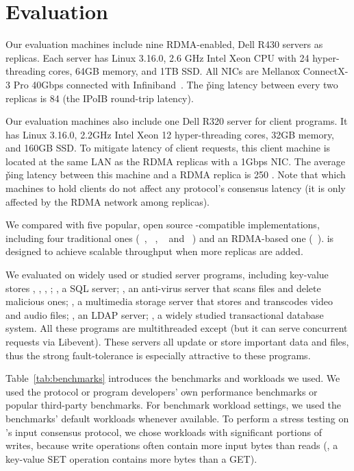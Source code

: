 \section{Evaluation} \label{sec:evaluation}





Our evaluation machines include nine RDMA-enabled, Dell R430 servers as \paxos 
replicas. Each server has Linux 3.16.0, 2.6 GHz Intel Xeon CPU with 24 
hyper-threading cores, 64GB memory, and 1TB SSD. All NICs are Mellanox 
ConnectX-3 Pro 40Gbps connected with Infiniband~\cite{infiniband}. 
The \v{ping} latency between every two replicas is 84 \us (the IPoIB 
round-trip latency).
%

Our evaluation machines also include one Dell R320 server for client programs. 
It has Linux 3.16.0, 2.2GHz Intel Xeon 12 hyper-threading cores, 32GB memory, 
and 160GB SSD. To mitigate latency of client requests, this client machine is 
located at the same LAN as the RDMA replicas with a 1Gbps NIC. The average 
\v{ping} latency between this machine and a RDMA replica is 250 \us. Note that 
which machines to hold clients do not affect any \paxos protocol's consensus 
latency (it is only affected by the RDMA network among replicas).

We compared \xxx with five popular, open source \paxos-compatible 
implementations,
including four traditional ones (\libpaxos~\cite{libpaxos},
\zookeeper~\cite{zookeeper}, \crane~\cite{crane:sosp15} and
\spaxos~\cite{spaxos:srds12}) and an RDMA-based one 
(\dare~\cite{dare:hpdc15}). \spaxos is designed to achieve scalable throughput 
when more replicas are added. 

We evaluated \xxx on \nprog widely used or studied server programs, including
\nkvprog key-value stores \redis, \memcached, \ssdb, \mongodb; \mysql, a SQL
server; \clamav, an anti-virus server that scans files and delete malicious ones;
\mediatomb, a multimedia storage server that stores and transcodes video and
audio files; \openldap, an LDAP server; \calvin, a widely studied transactional
database system. All these programs are multithreaded except \redis (but it can 
serve concurrent requests via Libevent). These servers all update or store 
important data and files, thus the strong \paxos fault-tolerance is especially 
attractive to these programs.


Table~\ref{tab:benchmarks} introduces the benchmarks and workloads we used. We 
used the protocol or program developers' own performance benchmarks or popular 
third-party benchmarks. For benchmark workload settings, we used the 
benchmarks' default workloads whenever available. To perform a stress testing 
on \xxx's input consensus protocol, we chose workloads with significant 
portions of writes, because write operations often contain more input bytes 
than reads (\eg, a key-value SET operation contains more bytes than a GET).

